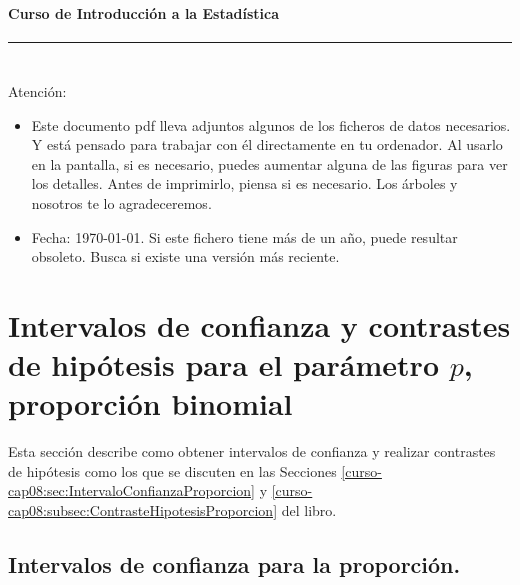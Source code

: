 \documentclass[10pt,a4paper]{article}\usepackage[]{graphicx}\usepackage[]{color}
\newcounter {cont01}
\begin{document}


\paragraph{\hspace{6.3cm}Curso de Introducción a la Estadística\\[2mm]} \noindent\hrule

\setcounter{section}{0}
\section*{\hspace{-0.1cm}} Atención:
\begin{itemize}
  \item Este documento pdf lleva adjuntos algunos de los ficheros de datos necesarios. Y está
      pensado para trabajar con él directamente en tu ordenador. Al usarlo en la pantalla, si es
      necesario, puedes aumentar alguna de las figuras para ver los detalles. Antes de
      imprimirlo, piensa si es necesario. Los árboles y nosotros te lo agradeceremos.
  \item Fecha: \today. Si este fichero tiene más de un año, puede resultar obsoleto. Busca si
      existe una versión más reciente.
\end{itemize}
\setcounter{tocdepth}{1}
\tableofcontents

\section{Intervalos de confianza y contrastes de hipótesis para el parámetro $p$, proporción binomial}

Esta sección describe como obtener intervalos de confianza y realizar contrastes de hipótesis como los que se discuten en las Secciones \ref{curso-cap08:sec:IntervaloConfianzaProporcion} y \ref{curso-cap08:subsec:ContrasteHipotesisProporcion} del libro.

\subsection{Intervalos de confianza para la proporción.}
\end{document}
